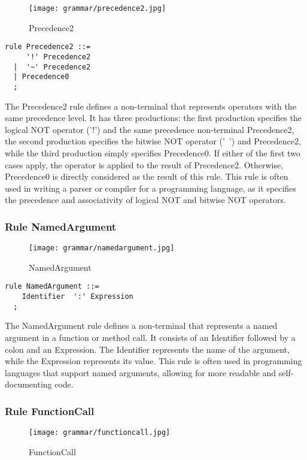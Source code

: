 \begin{figure}[!ht]
\centering
\texttt{[image: grammar/precedence2.jpg]}
\caption{Precedence2}
\end{figure}

\begin{lstlisting}
rule Precedence2 ::=
     '!' Precedence2 
  |  '~' Precedence2 
  | Precedence0 
  ;
\end{lstlisting}

The Precedence2 rule defines a non-terminal that represents operators with the same precedence level. It has three productions: the first production specifies the logical NOT operator ('!') and the same precedence non-terminal Precedence2, the second production specifies the bitwise NOT operator ('~') and Precedence2, while the third production simply specifies Precedence0. If either of the first two cases apply, the operator is applied to the result of Precedence2. Otherwise, Precedence0 is directly considered as the result of this rule. This rule is often used in writing a parser or compiler for a programming language, as it specifies the precedence and associativity of logical NOT and bitwise NOT operators.
\subsubsection*{Rule NamedArgument}

\begin{figure}[!ht]
\centering
\texttt{[image: grammar/namedargument.jpg]}
\caption{NamedArgument}
\end{figure}

\begin{lstlisting}
rule NamedArgument ::=
    Identifier  ':' Expression 
  ;
\end{lstlisting}

The NamedArgument rule defines a non-terminal that represents a named argument in a function or method call. It consists of an Identifier followed by a colon and an Expression. The Identifier represents the name of the argument, while the Expression represents its value. This rule is often used in programming languages that support named arguments, allowing for more readable and self-documenting code.

\subsubsection*{Rule FunctionCall}

\begin{figure}[!ht]
\centering
\texttt{[image: grammar/functioncall.jpg]}
\caption{FunctionCall}
\end{figure}

